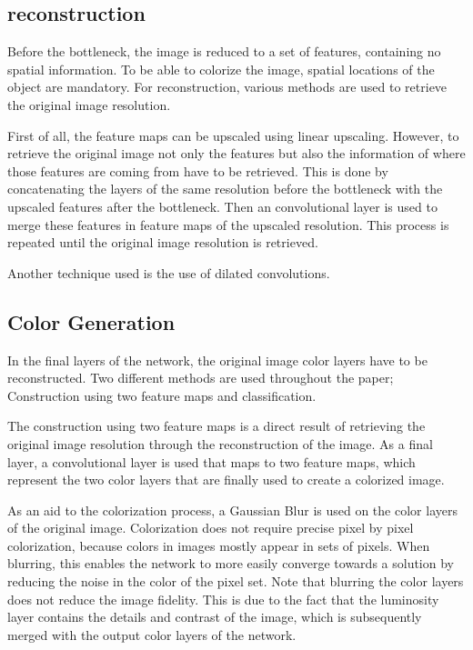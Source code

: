 \subsection{reconstruction}
Before the bottleneck, the image is reduced to a set of features, containing no spatial information. To be able to colorize the image, spatial locations of the object are mandatory. For reconstruction, various methods are used to retrieve the original image resolution.

First of all, the feature maps can be upscaled using linear upscaling. However, to retrieve the original image not only the features but also the information of where those features are coming from have to be retrieved. This is done by concatenating the layers of the same resolution before the bottleneck with the upscaled features after the bottleneck. Then an convolutional layer is used to merge these features in feature maps of the upscaled resolution. This process is repeated until the original image resolution is retrieved.

{\color{red}Another technique used is the use of dilated convolutions.} %

\subsection{Color Generation}
In the final layers of the network, the original image color layers have to be reconstructed. Two different methods are used throughout the paper; Construction using two feature maps and classification.

The construction using two feature maps is a direct result of retrieving the original image resolution through the reconstruction of the image. As a final layer, a convolutional layer is used that maps to two feature maps, which represent the two color layers that are finally used to create a colorized image.

As an aid to the colorization process, a Gaussian Blur is used on the color layers of the original image. Colorization does not require precise pixel by pixel colorization, because colors in images mostly appear in sets of pixels. When blurring, this enables the network to more easily converge towards a solution by reducing the noise in the color of the pixel set. Note that blurring the color layers does not reduce the image fidelity. This is due to the fact that the luminosity layer contains the details and contrast of the image, which is subsequently merged with the output color layers of the network.

